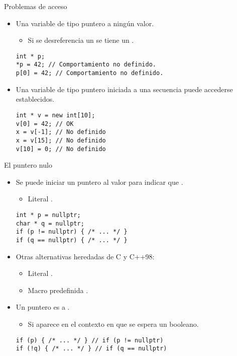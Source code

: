 \begin{frame}[t,fragile]{Problemas de acceso}
\begin{itemize}
  \item Una variable de tipo puntero  
        a ningún valor.
    \begin{itemize}
      \item Si se desreferencia un  se tiene un 
            .
    \end{itemize}
\begin{lstlisting}
int * p;
*p = 42; // Comportamiento no definido.
p[0] = 42; // Comportamiento no definido.
\end{lstlisting}

  \item Una variable de tipo puntero iniciada a una secuencia 
         puede accederse 
         establecidos.
\begin{lstlisting}
int * v = new int[10];
v[0] = 42; // OK
x = v[-1]; // No definido
x = v[15]; // No definido
v[10] = 0; // No definido
\end{lstlisting}
\end{itemize}
\end{frame}

\begin{frame}[t,fragile]{El puntero nulo}
\begin{itemize}
  \item Se puede iniciar un puntero al valor  para indicar 
        que .
    \begin{itemize}
      \item Literal .
    \end{itemize}
\begin{lstlisting}
int * p = nullptr;
char * q = nullptr;
if (p != nullptr) { /* ... */ }
if (q == nullptr) { /* ... */ }
\end{lstlisting}

  \item Otras alternativas heredadas de C y C++98:
    \begin{itemize}
      \item Literal .
      \item Macro predefinida .
    \end{itemize}

  \item Un puntero es  a .
    \begin{itemize}
      \item Si aparece en el contexto en que se espera un booleano.
    \end{itemize}
\begin{lstlisting}
if (p) { /* ... */ } // if (p != nullptr) 
if (!q) { /* ... */ } // if (q == nullptr)
\end{lstlisting}
\end{itemize}
\end{frame}

